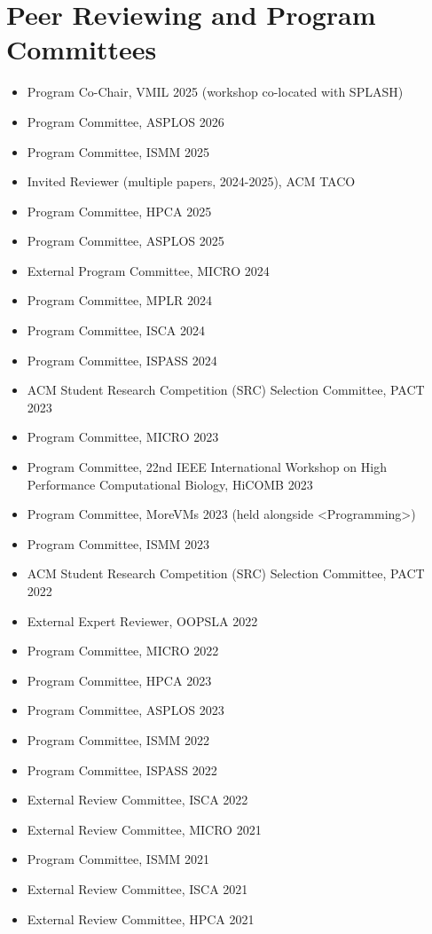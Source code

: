 \documentclass[singlecolumn,singlespace,11pt]{article}
\begin{document}
\section*{Peer Reviewing and Program Committees}
\begin{itemize}
\item Program Co-Chair, VMIL 2025 (workshop co-located with SPLASH)
\item Program Committee, ASPLOS 2026
\item Program Committee, ISMM 2025
\item Invited Reviewer (multiple papers, 2024-2025), ACM TACO
\item Program Committee, HPCA 2025
\item Program Committee, ASPLOS 2025
\item External Program Committee, MICRO 2024
\item Program Committee, MPLR 2024
\item Program Committee, ISCA 2024
\item Program Committee, ISPASS 2024
\item ACM Student Research Competition (SRC) Selection Committee, PACT 2023
\item Program Committee, MICRO 2023
\item Program Committee, 22nd IEEE International Workshop on High Performance Computational Biology, HiCOMB 2023
\item Program Committee, MoreVMs 2023 (held alongside <Programming>) 
\item Program Committee, ISMM 2023
\item ACM Student Research Competition (SRC) Selection Committee, PACT 2022
\item External Expert Reviewer, OOPSLA 2022
\item Program Committee, MICRO 2022
\item Program Committee, HPCA 2023
\item Program Committee, ASPLOS 2023
\item Program Committee, ISMM 2022
\item Program Committee, ISPASS 2022
\item External Review Committee, ISCA 2022
\item External Review Committee, MICRO 2021
\item Program Committee, ISMM 2021
\item External Review Committee, ISCA 2021
\item External Review Committee, HPCA 2021

\end{itemize}
\end{document}
